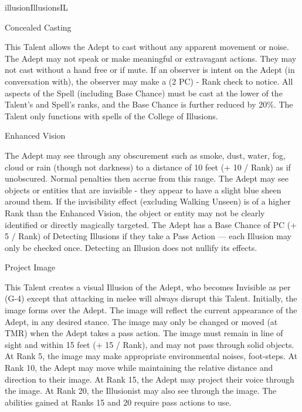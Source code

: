 \begin{college}[1.4]{illusion}{Illusions}{IL}
\begin{talent}[T-1]{Concealed Casting}
\begin{effects}
This Talent allows the Adept to cast without any apparent movement or
noise. The Adept may not speak or make meaningful or extravagant
actions. They may not cast without a hand free or if mute. If an
observer is intent on the Adept (\eg in conversation with), the
observer may make a (2 \x PC) - Rank check to notice. All aspects of
the Spell (including Base Chance) must be cast at the lower of the
Talent's and Spell's ranks, and the Base Chance is further reduced by
20\%. The Talent only functions with spells of the College of
Illusions.
\end{effects}
\end{talent}

\begin{talent}[T-2]{Enhanced Vision}

\begin{effects}
The Adept may see through any obscurement such as smoke, dust, water,
fog, cloud or rain (though not darkness) to a distance of 10 feet (+
10 / Rank) as if unobscured. Normal penalties then accrue from this
range. The Adept may see objects or entities that are invisible - they
appear to have a slight blue sheen around them. If the invisibility
effect (excluding Walking Unseen) is of a higher Rank than the
Enhanced Vision, the object or entity may not be clearly identified or
directly magically targeted. The Adept has a Base Chance of PC (+ 5 /
Rank) of Detecting Illusions if they take a Pass Action --- each
Illusion may only be checked once. Detecting an Illusion does not
nullify its effects.
\end{effects}
\end{talent}

\begin{talent}[T-3]{Project Image}

\begin{effects}
This Talent creates a visual Illusion of the Adept, who becomes
Invisible as per (G-4) except that attacking in melee will always
disrupt this Talent. Initially, the image forms over the Adept. The
image will reflect the current appearance of the Adept, in any desired
stance. The image may only be changed or moved (at TMR) when the Adept
takes a pass action. The image must remain in line of sight and within
15 feet (+ 15 / Rank), and may not pass through solid objects.  At
Rank 5, the image may make appropriate environmental noises, \eg
foot-steps. At Rank 10, the Adept may move while maintaining the
relative distance and direction to their image. At Rank 15, the Adept
may project their voice through the image. At Rank 20, the Illusionist
may also see through the image. The abilities gained at Ranks 15 and
20 require pass actions to use.
\end{effects}
\end{talent}


\end{college}
